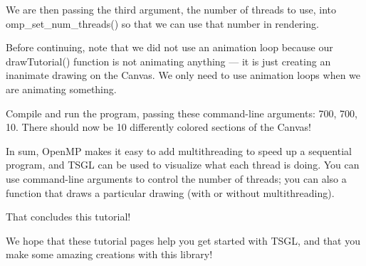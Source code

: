 We are then passing the third argument, the number of threads to use, into {\ttfamily omp\-\_\-set\-\_\-num\-\_\-threads()} so that we can use that number in rendering.

Before continuing, note that we did not use an animation loop because our {\ttfamily draw\-Tutorial()} function is not animating anything — it is just creating an inanimate drawing on the Canvas. We only need to use animation loops when we are animating something.

Compile and run the program, passing these command-\/line arguments\-: 700, 700, 10. There should now be 10 differently colored sections of the Canvas!

In sum, Open\-M\-P makes it easy to add multithreading to speed up a sequential program, and T\-S\-G\-L can be used to visualize what each thread is doing. You can use command-\/line arguments to control the number of threads; you can also a function that draws a particular drawing (with or without multithreading).

That concludes this tutorial!

We hope that these tutorial pages help you get started with T\-S\-G\-L, and that you make some amazing creations with this library! 